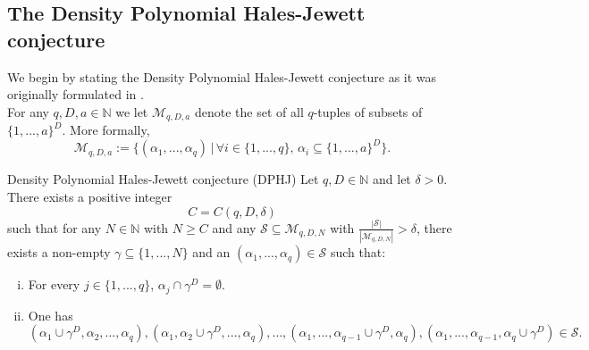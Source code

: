\documentclass[11pt,american,preprint]{elsarticle}
\numberwithin{equation}{section}
\theoremstyle{plain}
\theoremstyle{plain*}
\theoremstyle{plain}
\theoremstyle{plain*}
\theoremstyle{plain}
\theoremstyle{plain*}
\theoremstyle{remark}
\theoremstyle{remark*}
\theoremstyle{remark}
\theoremstyle{remark*}
\theoremstyle{remark}
\theoremstyle{remark*}
\theoremstyle{plain}
\theoremstyle{definition}
\theoremstyle{plain}
\theoremstyle{plain} %
\newcommand{\thistheoremname}{}
\newtheorem*{genericthm*}{\thistheoremname}
\newenvironment{namedthm*}[1]
  {\renewcommand{\thistheoremname}{#1}%
   \begin{genericthm*}}
  {\end{genericthm*}}
\newcommand{\N}{\mathbb{N}}
\begin{document}
 \subsection{The Density Polynomial Hales-Jewett conjecture}\label{A.sec.DPHJConjecture}
We begin by stating the Density Polynomial Hales-Jewett  conjecture as it was originally formulated in \cite[p. 56]{ERTaU}.\\
For any  $q,D,a\in\N$ we let $\mathcal M_{q,D,a}$ denote the set of all $q$-tuples of subsets of $\{1,...,a\}^D$. More formally,  
 $$\mathcal M_{q,D,a}:=\{(\alpha_1,...,\alpha_q)\,|\,\forall i\in\{1,...,q\},\,\alpha_i\subseteq \{1,...,a\}^D\}.$$
 \begin{namedthm*}{Density Polynomial Hales-Jewett conjecture (DPHJ)} Let $q,D\in\N$ and let $\delta>0$. There exists a positive integer 
 \begin{equation}\label{A.eq:DPHJConstant}
 C=C(q,D,\delta)
 \end{equation}
 such that for any $N\in\N$ with $N\geq C$ and any $\mathcal S\subseteq \mathcal M_{q,D,N}$ with $\frac{|\mathcal S|}{|\mathcal M_{q,D,N}|}>\delta$, there exists a non-empty $\gamma\subseteq \{1,...,N\}$ and an $(\alpha_1,...,\alpha_q)\in \mathcal S$ such that: 
 \begin{enumerate}[(i)]
\item For every $j\in\{1,...,q\}$, $\alpha_j\cap \gamma^D=\emptyset$.
\item One has
\begin{equation*}
(\alpha_1\cup \gamma^D,\alpha_2,...,\alpha_q),(\alpha_1,\alpha_2\cup \gamma^D,...,\alpha_q),\dots,
(\alpha_1,...,\alpha_{q-1}\cup\gamma^D,\alpha_q), (\alpha_1,...,\alpha_{q-1},\alpha_q\cup\gamma^D)\in\mathcal S.
\end{equation*}
\end{enumerate}
 \end{namedthm*}


\end{document}
